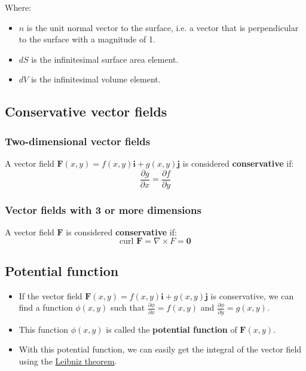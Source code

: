 \documentclass[11pt]{article}
\begin{document}
Where:
\begin{itemize}
\item \(\hat{n}\) is the unit normal vector to the surface, i.e. a vector that is perpendicular to the surface with a magnitude of 1.
\item \(dS\) is the infinitesimal surface area element.
\item \(dV\) is the infinitesimal volume element.
\end{itemize}

\subsection{Conservative vector fields}
\label{sec:org71c7012}

\subsubsection{Two-dimensional vector fields}
\label{sec:org34fbad7}
A vector field \(\boldsymbol{F} (x, y) = f(x, y) \boldsymbol{i} + g(x, y) \boldsymbol{j}\) is considered \textbf{conservative} if:
\[\frac{\partial g}{\partial x} = \frac{\partial f}{\partial y}\]

\subsubsection{Vector fields with 3 or more dimensions}
\label{sec:org371030f}
A vector field \(\boldsymbol{F}\) is considered \textbf{conservative} if:
\[\text{curl } \boldsymbol{F} = \nabla \times F = \boldsymbol{0}\]

\subsection{Potential function}
\label{sec:org090c6c0}
\begin{itemize}
\item If the vector field \(\boldsymbol{F} (x, y) = f(x, y) \boldsymbol{i} + g(x, y) \boldsymbol{j}\) is conservative, we can find a function \(\phi (x, y)\) such that \(\frac{\partial \phi}{\partial x} = f(x, y)\) and \(\frac{\partial \phi}{\partial y} = g(x, y)\).
\item This function \(\phi (x, y)\) is called the \textbf{potential function} of \(\boldsymbol{F} (x, y)\).
\item With this potential function, we can easily get the integral of the vector field using the \hyperref[org93051a9]{Leibniz theorem}.
\end{itemize}
\end{document}
